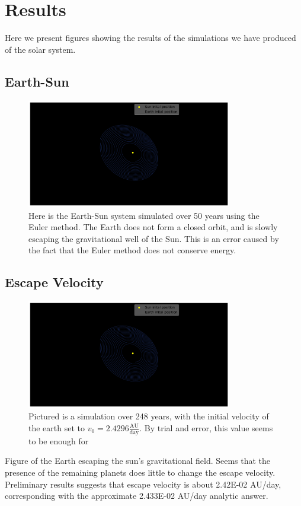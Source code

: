 \documentclass[../main.tex]{subfiles}
\begin{document}
\section{Results}\label{sec:results}

Here we present figures showing the results of the simulations we have produced of the solar system. 

\subsection{Earth-Sun}

\begin{figure}
    \centering
    \includegraphics[trim=15cm 5.cm 11cm 0.cm, clip,width=0.8\textwidth]{../figures/Euler_Earth_Sun.pdf}
    \caption{Here is the Earth-Sun system simulated over 50 years using the Euler method. The Earth does not form a closed orbit, and is slowly escaping the gravitational well of the Sun. This is an error caused by the fact that the Euler method does not conserve energy.}
    \label{fig:earth-sun-euler}
\end{figure}

\subsection{Escape Velocity}

\begin{figure}
    \centering
    \includegraphics[trim=15cm 5.cm 11cm 0.cm, clip,width=0.8\textwidth]{../figures/Euler_Earth_Sun.pdf}
    \caption{Pictured is a simulation over 248 years, with the initial velocity of the earth set to $v_0 = 2.4296 \frac{\text{AU}}{\text{day}}$. By trial and error, this value seems to be enough for }
    \label{fig:my_label}
\end{figure}Figure of the Earth escaping the sun's gravitational field. Seems that the presence of the remaining planets does little to change the escape velocity. Preliminary results suggests that escape velocity is about 2.42E-02 AU/day, corresponding with the approximate 2.433E-02 AU/day analytic answer.
\end{document}
